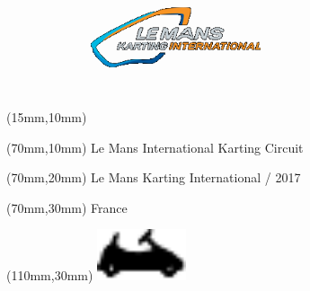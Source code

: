 \null\newpage
\begin{textblock*}{50mm}(15mm,10mm)%
\includegraphics[width=50mm]{LG/LEK.png}
\end{textblock*}
\begin{textblock*}{130mm}(70mm,10mm)%
{\fontsize{20}{20}\selectfont Le Mans International Karting Circuit}\\
\end{textblock*}
\begin{textblock*}{120mm}(70mm,20mm)%
{\fontsize{16}{16}\selectfont Le Mans Karting International / 2017}\\
\end{textblock*}
\begin{textblock*}{120mm}(70mm,30mm)%
{\fontsize{12}{12}\selectfont France}
\end{textblock*}
\begin{textblock*}{30mm}(110mm,30mm)%
\centering
\includegraphics[height=15mm]{icons/kart.pdf}
\end{textblock*}
